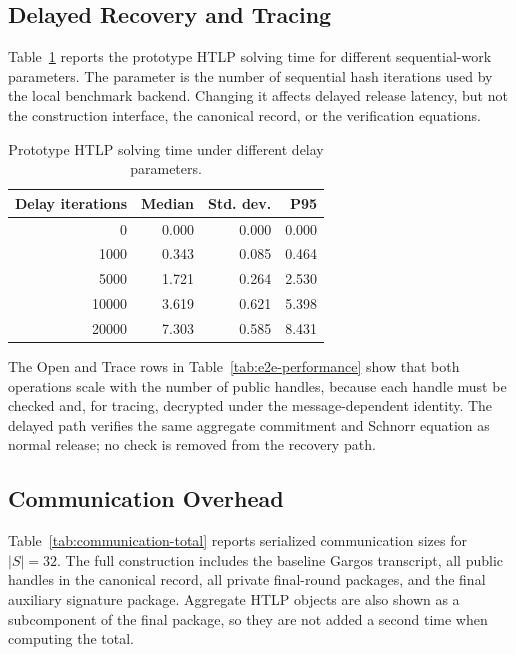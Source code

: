 \subsection{Delayed Recovery and Tracing}

Table~\ref{tab:htlp-delay} reports the prototype HTLP solving time for different
sequential-work parameters.  The parameter is the number of sequential hash
iterations used by the local benchmark backend.  Changing it affects delayed
release latency, but not the construction interface, the canonical record, or
the verification equations.

\begin{table}[t]
\centering
\caption{Prototype HTLP solving time under different delay parameters.}
\label{tab:htlp-delay}
\small
\begin{tabular}{rrrr}
\toprule
Delay iterations & Median & Std. dev. & P95 \\
\midrule
0 & 0.000 & 0.000 & 0.000 \\
1000 & 0.343 & 0.085 & 0.464 \\
5000 & 1.721 & 0.264 & 2.530 \\
10000 & 3.619 & 0.621 & 5.398 \\
20000 & 7.303 & 0.585 & 8.431 \\
\bottomrule
\end{tabular}
\end{table}

The \textsf{Open} and \textsf{Trace} rows in Table~\ref{tab:e2e-performance} show
that both operations scale with the number of public handles, because each
handle must be checked and, for tracing, decrypted under the message-dependent
identity.  The delayed path verifies the same aggregate commitment and Schnorr
equation as normal release; no check is removed from the recovery path.

\subsection{Communication Overhead}

Table~\ref{tab:communication-total} reports serialized communication sizes for
$|S|=32$.  The full construction includes the baseline Gargos transcript, all
public handles in the canonical record, all private final-round packages, and
the final auxiliary signature package.  Aggregate HTLP objects are also shown as
a subcomponent of the final package, so they are not added a second time when
computing the total.

